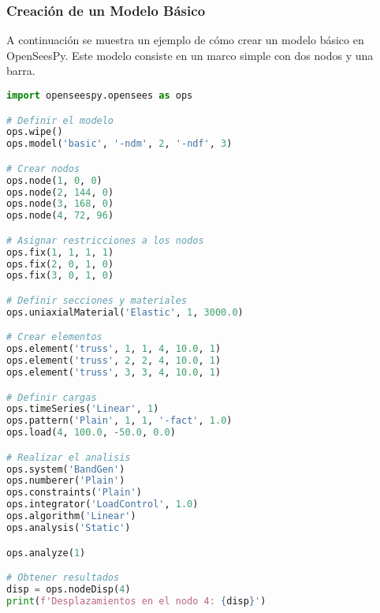 \documentclass[conference]{IEEEtran}
\begin{document}
	\subsubsection{Creación de un Modelo Básico}
	A continuación se muestra un ejemplo de cómo crear un modelo básico en OpenSeesPy. 
	Este modelo consiste en un marco simple con dos nodos y una barra.
	\begin{lstlisting}[language=Python, caption=Creación de un Modelo Básico en OpenSeesPy]
import openseespy.opensees as ops

# Definir el modelo
ops.wipe()
ops.model('basic', '-ndm', 2, '-ndf', 3)

# Crear nodos
ops.node(1, 0, 0)
ops.node(2, 144, 0)
ops.node(3, 168, 0)
ops.node(4, 72, 96)

# Asignar restricciones a los nodos
ops.fix(1, 1, 1, 1)
ops.fix(2, 0, 1, 0)
ops.fix(3, 0, 1, 0)

# Definir secciones y materiales
ops.uniaxialMaterial('Elastic', 1, 3000.0)

# Crear elementos
ops.element('truss', 1, 1, 4, 10.0, 1)
ops.element('truss', 2, 2, 4, 10.0, 1)
ops.element('truss', 3, 3, 4, 10.0, 1)

# Definir cargas
ops.timeSeries('Linear', 1)
ops.pattern('Plain', 1, 1, '-fact', 1.0)
ops.load(4, 100.0, -50.0, 0.0)

# Realizar el analisis
ops.system('BandGen')
ops.numberer('Plain')
ops.constraints('Plain')
ops.integrator('LoadControl', 1.0)
ops.algorithm('Linear')
ops.analysis('Static')

ops.analyze(1)

# Obtener resultados
disp = ops.nodeDisp(4)
print(f'Desplazamientos en el nodo 4: {disp}')
		\end{lstlisting}
				
\end{document}
